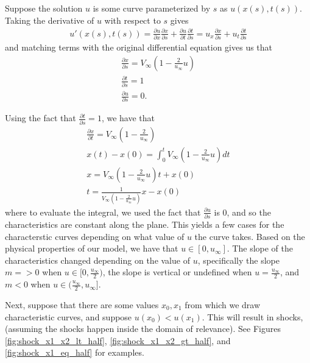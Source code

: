 \documentclass[12pt]{article}
\begin{document}
	Suppose the solution $u$ is some curve parameterized by $s$ as $u(x(s), t(s))$. Taking the derivative of $u$ with respect to $s$ gives 
	\begin{align*} %
	u'(x(s), t(s)) = \frac{\partial u}{\partial x} \frac{\partial x}{\partial s}  + \frac{\partial u}{\partial t} \frac{\partial t}{\partial s} = u_x \frac{\partial x}{\partial s}  + u_t \frac{\partial t}{\partial s}
	\end{align*}
	and matching terms with the original differential equation gives us that 
	\begin{align*}
	\frac{\partial x}{\partial s}  = V_\infty \left( 1 - \frac{2}{u_\infty} u \right) \\
	\frac{\partial t}{\partial s} = 1 \\
	\frac{\partial u}{\partial s} = 0 .
	\end{align*}
	
	Using the fact that $\frac{\partial t}{\partial s} = 1$, we have that 
	\begin{align*}
	\frac{\partial x }{\partial t} = V_\infty (1 - \frac{2}{u_\infty} ) \\
	x(t) - x(0) = \int_{0}^{t} V_\infty(1 - \frac{2}{u_\infty} u) dt \\
	x = V_\infty(1 - \frac{2}{u_\infty} u) t + x(0) \\
	t = \frac{1}{  V_\infty(1 - \frac{2}{u_\infty} u) }x - x(0)
	\end{align*}
	where to evaluate the integral, we used the fact that $\frac{\partial u}{\partial s}$ is $0$, and so the characteristics are constant along the plane. This yields a few cases for the characterstic curves depending on what value of $u$ the curve takes. Based on the physical properties of our model, we have that $u \in [0, u_\infty]$. The slope of the characteristics changed depending on the value of $u$, specifically the slope $m = > 0$ when $u \in [0, \frac{u_\infty}{2}) $, the slope is vertical or undefined when $u = \frac{u_\infty}{2}$, and $m < 0$ when $u \in ( \frac{u_\infty}{2}, u_\infty]$.
	
	Next, suppose that there are some values $x_0, x_1$ from which we draw characteristic curves, and suppose $u(x_0) < u(x_1)$. This will result in shocks, (assuming the shocks happen inside the domain of relevance). See Figures \ref{fig:shock_x1_x2_lt_half}, \ref{fig:shock_x1_x2_gt_half}, and \ref{fig:shock_x1_eq_half} for examples. 
	
\end{document}
